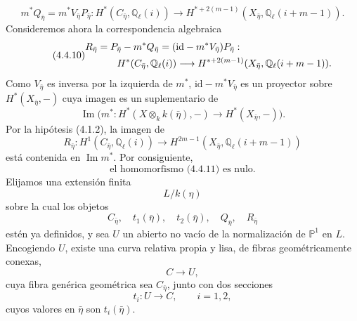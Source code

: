 \begin{equation}\tag{4.4.9}
m^*Q_{\bar\eta}=m^*V_{\bar\eta}P_{\bar\eta}:
H^*(C_{\bar\eta},\mathbb Q_\ell(i))
\longrightarrow
H^{*+2(m-1)}(X_{\bar\eta},\mathbb Q_\ell(i+m-1)).
\end{equation}
Consideremos ahora la correspondencia algebraica
\begin{equation}\tag{4.4.10}
\begin{split}
R_{\bar\eta}
&=P_{\bar\eta}-m^*Q_{\bar\eta}
=(\mathrm{id}-m^*V_{\bar\eta})P_{\bar\eta}:\\
&\hspace{2em}H^*(C_{\bar\eta},\mathbb Q_\ell(i))
\longrightarrow
H^{*+2(m-1)}(X_{\bar\eta},\mathbb Q_\ell(i+m-1)).
\end{split}
\end{equation}
Como $V_{\bar\eta}$ es inversa por la izquierda de $m^*$,
$\mathrm{id}-m^*V_{\bar\eta}$ es un proyector sobre
$H^*(X_{\bar\eta},-)$ cuya imagen es un suplementario de
\begin{equation*}
\operatorname{Im}\bigl(m^*:H^*(X\otimes_k k(\bar\eta),-)
\longrightarrow H^*(X_{\bar\eta},-)\bigr).
\end{equation*}
Por la hipótesis (4.1.2), la imagen de
\begin{equation}\tag{4.4.11}
R_{\bar\eta}:H^1(C_{\bar\eta},\mathbb Q_\ell(i))
\longrightarrow
H^{2m-1}(X_{\bar\eta},\mathbb Q_\ell(i+m-1))
\end{equation}
está contenida en $\operatorname{Im}m^*$. Por consiguiente,
\begin{equation}\tag{4.4.12}
\text{el homomorfismo (4.4.11) es nulo.}
\end{equation}
Elijamos una extensión finita
\begin{equation*}
L/k(\eta)
\end{equation*}
sobre la cual los objetos
\begin{equation*}
C_{\bar\eta},\quad t_1(\bar\eta),\quad t_2(\bar\eta),\quad
Q_{\bar\eta},\quad R_{\bar\eta}
\end{equation*}
estén ya definidos, y sea $U$ un abierto no vacío de la normalización de
$\mathbb P^1$ en $L$. Encogiendo $U$, existe una curva relativa propia y
lisa, de fibras geométricamente conexas,
\begin{equation*}
C\longrightarrow U,
\end{equation*}
cuya fibra genérica geométrica sea $C_{\bar\eta}$, junto con dos
secciones
\begin{equation*}
t_i:U\longrightarrow C,\qquad i=1,2,
\end{equation*}
cuyos valores en $\bar\eta$ son $t_i(\bar\eta)$.

